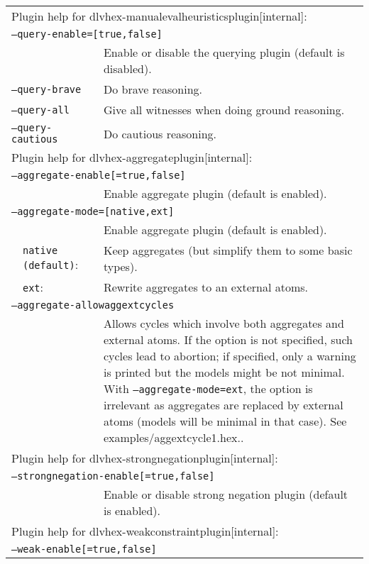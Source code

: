 \documentclass[a4paper, titlepage]{article}
\begin{document}
\begin{longtable}{ p{2.0em} p{2.2cm} p{0.6cm} p{8.0cm} }
\multicolumn{4}{l}{Plugin help for dlvhex-manualevalheuristicsplugin[internal]:}\\
\multicolumn{4}{l}{\texttt{--query-enable=[true,false]}}\\
& & & Enable or disable the querying plugin (default is disabled).\\
\multicolumn{3}{l}{\texttt{--query-brave}} &
  Do brave reasoning.\\
\multicolumn{3}{l}{\texttt{--query-all}} &
  Give all witnesses when doing ground reasoning. \\
\multicolumn{3}{l}{\texttt{--query-cautious}} &
  Do cautious reasoning.\\
\multicolumn{4}{l}{Plugin help for dlvhex-aggregateplugin[internal]:}\\
\multicolumn{4}{l}{\texttt{--aggregate-enable[=true,false]}}\\
& & & Enable aggregate plugin (default is enabled).\\
\multicolumn{4}{l}{\texttt{--aggregate-mode=[native,ext]}}\\
& & & Enable aggregate plugin (default is enabled).\\
&\texttt{native (default)}:&& Keep aggregates (but simplify them to some basic types).\\
&\texttt{ext}:&& Rewrite aggregates to an external atoms.\\
\multicolumn{4}{l}{\texttt{--aggregate-allowaggextcycles}}\\
& & & Allows cycles which involve both aggregates and external atoms. If the option is not specified, such cycles lead to abortion; if specified, only a warning is printed but the models might be not minimal. With \texttt{--aggregate-mode=ext}, the option is irrelevant as aggregates are replaced by external atoms (models will be minimal in that case). See examples/aggextcycle1.hex..\\
\multicolumn{4}{l}{Plugin help for dlvhex-strongnegationplugin[internal]:}\\
\multicolumn{4}{l}{\texttt{--strongnegation-enable[=true,false]}}\\
& & & Enable or disable strong negation plugin (default is enabled).\\ 
\multicolumn{4}{l}{Plugin help for dlvhex-weakconstraintplugin[internal]:}\\
\multicolumn{4}{l}{\texttt{--weak-enable[=true,false]}}\\

\end{longtable}
\end{document}
